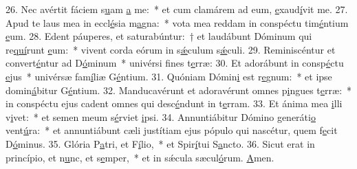 26. Nec avértit fáciem s\uline{u}am \uline{a} me:~* et cum clamárem ad eum, \uline{e}xaud\uline{í}vit me.
27. Apud te laus mea in eccl\uline{é}sia m\uline{a}gna:~* vota mea reddam in conspéctu tim\uline{é}ntium \uline{e}um.
28. Edent páuperes, et saturabúntur:~† et laudábunt Dóminum qui re\uline{quí}runt \uline{e}um:~* vivent corda eórum in s\uline{ǽ}culum s\uline{ǽ}culi.
29. Reminiscéntur et convert\uline{é}ntur ad D\uline{ó}minum~* univérsi f\uline{i}nes t\uline{e}rræ:
30. Et adorábunt in consp\uline{é}ctu \uline{e}jus~* univérsæ fam\uline{í}liæ G\uline{é}ntium.
31. Quóniam Dómin\uline{i} est r\uline{e}gnum:~* et ipse domin\uline{á}bitur G\uline{é}ntium.
32. Manducavérunt et adoravérunt omnes p\uline{i}ngues t\uline{e}rræ:~* in conspéctu ejus cadent omnes qui desc\uline{é}ndunt in t\uline{e}rram.
33. Et ánima mea \uline{i}lli v\uline{i}vet:~* et semen meum s\uline{é}rviet \uline{i}psi.
34. Annuntiábitur Dómino generáti\uline{o} vent\uline{ú}ra:~* et annuntiábunt cæli justítiam ejus pópulo qui nascétur, quem f\uline{e}cit D\uline{ó}minus.
35. Glória P\uline{a}tri, et F\uline{í}lio,~* et Spir\uline{í}tui S\uline{a}ncto.
36. Sicut erat in princípio, et n\uline{u}nc, et s\uline{e}mper,~* et in sǽcula sæcul\uline{ó}rum. \uline{A}men.
